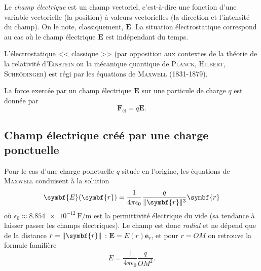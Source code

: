 \documentclass{article}
\newcommand{\vv}[1]{\symbf{#1}}
\DeclarePairedDelimiter{\norm}{\lVert}{\rVert}
\theoremstyle{definition}
\theoremstyle{remark}
\begin{document}
Le \textit{champ électrique} est un champ vectoriel, c'est-à-dire une fonction d'une variable vectorielle (la position) à valeurs vectorielles (la direction et l'intensité du champ). On le note, classiquement, $\vv{E}$. La situation électrostatique correspond au cas où le champ électrique $\vv{E}$ est indépendant du temps.

L'électrostatique << classique >> (par opposition aux contextes de la théorie de la relativité d'\textsc{Einstein} ou la mécanique quantique de \textsc{Planck}, \textsc{Hilbert}, \textsc{Schrödinger}) est régi par les équations de \textsc{Maxwell} (1831-1879). 


La force exercée par un champ électrique $\vv{E}$ sur une particule de charge $q$ est donnée par
	\[ \vv{F}_\mathrm{él} = q\vv{E}. \]

\subsection{Champ électrique créé par une charge ponctuelle}

Pour le cas d'une charge ponctuelle $q$ située en l'origine, les équations de \textsc{Maxwell} conduisent à la solution
	\[ \vv{E}(\vv{r}) = \frac{1}{4\pi\epsilon_0}\frac{q}{\norm{\vv{r}}^3}\vv{r} \]
où $\epsilon_0\approx\SI{8.854e-12}{\farad\per\meter}$ est la permittivité électrique du vide (sa tendance à laisser passer les champs électriques). Le champ est donc \textit{radial} et ne dépend que de la distance $r=\norm{\vv{r}}$ : $\vv{E} = E(r)\vv{e}_r$, et pour $r = OM$ on retrouve la formule familière
	\[
    E = \frac{1}{4\pi\epsilon_0}\frac{q}{{OM}^2}.
    \]
\end{document}
